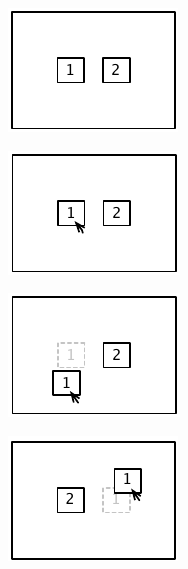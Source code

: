\begin{figure}[hbt]
    \newcommand{\subfigurewidth}{0.28\textwidth}
    \newcommand{\graphicsscale}{1.2}
    \centering
    \begin{subfigure}{\subfigurewidth}
        \centering
        \includegraphics[scale=\graphicsscale]{resources/movement-action-example-a}
        \caption{}
        \label{fig:movement-action-example-a}
    \end{subfigure}
    \begin{subfigure}{\subfigurewidth}
        \centering
        \includegraphics[scale=\graphicsscale]{resources/movement-action-example-b}
        \caption{}
        \label{fig:movement-action-example-b}
    \end{subfigure}
    \begin{subfigure}{\subfigurewidth}
        \centering
        \includegraphics[scale=\graphicsscale]{resources/movement-action-example-c}
        \caption{}
        \label{fig:movement-action-example-c}
    \end{subfigure}
    \begin{subfigure}{\subfigurewidth}
        \centering
        \includegraphics[scale=\graphicsscale]{resources/movement-action-example-d}

\end{subfigure}
\end{figure}
